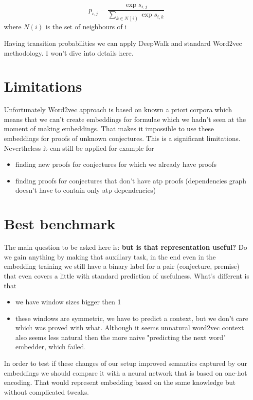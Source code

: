 \documentclass{article} %
\begin{document}
$$ p_{i,j} = \frac{\exp{s_{i, j}}}{\sum_{k \in N(i)} \exp{s_{i, k}}} $$
where $N(i)$ is the set of neighbours of i
	
Having transition probabilities we can apply DeepWalk and standard Word2vec methodology. I won't dive into details here.

\section{Limitations}

Unfortunately Word2vec approach is based on known a priori corpora which means that we can't create embeddings for formulae which we hadn't seen at the moment of making embeddings. That makes it impossible to use these embeddings for proofs of unknown conjectures. This is a significant limitations. Nevertheless it can still be applied for example for 
\begin{itemize}
\item{finding new proofs for conjectures for which we already have proofs}
\item{finding proofs for conjectures that don't have atp proofs (dependencies graph doesn't have to contain only atp dependencies)}
\end{itemize}

\section{Best benchmark}

The main question to be asked here is: \textbf{but is that representation useful?} Do we gain anything by making that auxillary task, in the end even in the embedding training we still have a binary label for a pair (conjecture, premise) that even covers a little with standard prediction of usefulness. What's different is that \begin{itemize} 
\item{we have window sizes bigger then 1}
\item{these windows are symmetric, we have to predict a context, but we don't care which was proved with what. Although it seems unnatural word2vec context also seems less natural then the more naive "predicting the next word" embedder, which failed.}
\end{itemize}

In order to test if these changes of our setup improved semantics captured by our embeddings we should compare it with a neural network that is based on one-hot encoding. That would represent embedding based on the same knowledge but without complicated tweaks.
\end{document}
